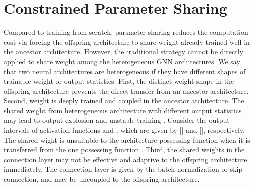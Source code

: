 \documentclass[sigconf]{acmart}
\begin{document}
\section{Constrained Parameter Sharing}


Compared to training from scratch, parameter sharing reduces the computation cost via forcing the offspring architecture to share weight already trained well in the ancestor architecture. However, the traditional strategy cannot be directly applied to share weight among the heterogeneous GNN architectures. We say that two neural architectures are heterogeneous if they have different shapes of trainable weight or output statistics. First, the distinct weight shape in the offspring architecture prevents the direct transfer from an ancestor architecture.
Second, weight is deeply trained and coupled in the ancestor architecture. The shared weight from heterogeneous architecture with different output statistics may lead to output explosion and unstable training \cite{guo2019single}. Consider the output intervals of activation functions  and , which are given by [] and [], respectively. The shared wight is unsuitable to the architecture possessing function  when it is transferred from the one possessing function . Third, the shared weights in the connection layer may not be effective and adaptive to the offspring architecture immediately. The connection layer is given by the batch normalization or skip connection, and may be uncoupled to the offspring architecture. 
\end{document}
